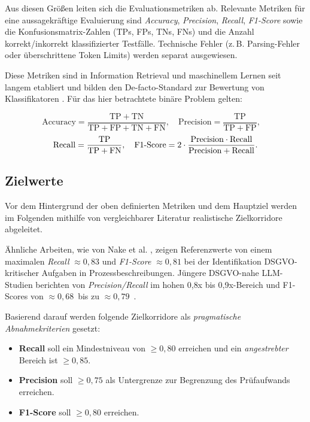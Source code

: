 Aus diesen Größen leiten sich die Evaluationsmetriken ab. Relevante Metriken für eine aussagekräftige Evaluierung sind \emph{Accuracy}, \emph{Precision}, \emph{Recall}, \emph{F1-Score} sowie die Konfusionsmatrix-Zahlen (\acp{TP}, \acp{FP}, \acp{TN}, \acp{FN}) und die Anzahl korrekt/inkorrekt klassifizierter Testfälle. Technische Fehler (z.\,B. Parsing-Fehler oder überschrittene Token Limits) werden separat ausgewiesen.

Diese Metriken sind in Information Retrieval und maschinellem Lernen seit langem etabliert und bilden den De-facto-Standard zur Bewertung von Klassifikatoren \cite{manning2008ir, sokolova2009measureclassification, nake2023towards}. Für das hier betrachtete binäre Problem gelten:

\[
    \mathrm{Accuracy}=\frac{\mathrm{TP}+\mathrm{TN}}{\mathrm{TP}+\mathrm{FP}+\mathrm{TN}+\mathrm{FN}},\quad
    \mathrm{Precision}=\frac{\mathrm{TP}}{\mathrm{TP}+\mathrm{FP}},\quad
\]
\vspace{0.5em}
\[
    \mathrm{Recall}=\frac{\mathrm{TP}}{\mathrm{TP}+\mathrm{FN}},\quad
    \mathrm{F1\mathchar`-Score}=2\cdot\frac{\mathrm{Precision}\cdot \mathrm{Recall}}{\mathrm{Precision}+\mathrm{Recall}}.
\]

\subsection*{Zielwerte}

Vor dem Hintergrund der oben definierten Metriken und dem Hauptziel werden im Folgenden mithilfe von vergleichbarer Literatur realistische Zielkorridore abgeleitet.

Ähnliche Arbeiten, wie von Nake et al. \cite{nake2023towards}, zeigen Referenzwerte von einem maximalen \emph{Recall} $\approx 0{,}83$ und \emph{F1-Score} $\approx 0{,}81$ bei der Identifikation \ac{DSGVO}-kritischer Aufgaben in Prozessbeschreibungen. Jüngere \ac{DSGVO}-nahe \ac{LLM}-Studien berichten von \emph{Precision/Recall} im hohen 0{,}8x bis 0{,}9x-Bereich \cite{hooda2024policylr} und F1-Scores von $\approx 0{,}68$~bis zu $\approx 0{,}79$~\cite{schwerin2024systematic}.

Basierend darauf werden folgende Zielkorridore als \emph{pragmatische Abnahmekriterien} gesetzt:

\begin{itemize}
    \item \textbf{Recall} soll ein Mindestniveau von $\geq 0{,}80$ erreichen und ein \emph{angestrebter} Bereich ist $\geq 0{,}85$.
    \item \textbf{Precision} soll $\geq 0{,}75$ als Untergrenze zur Begrenzung des Prüfaufwands erreichen.
    \item \textbf{F1-Score} soll $\geq 0{,}80$ erreichen.
\end{itemize}

